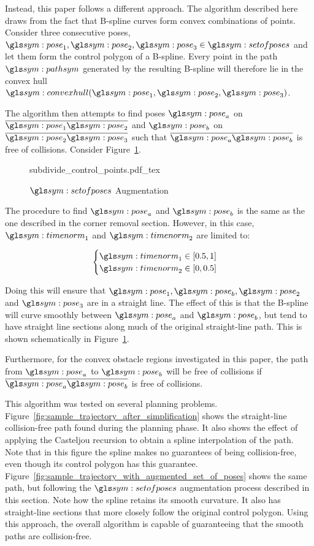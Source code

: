		Instead, this paper follows a different approach. The algorithm
		described here draws from the fact that B-spline curves form convex
		combinations of points. Consider three consecutive poses, $\pose_1,
		\pose_2, \pose_3 \in \setofposes$ and let them form the control polygon
		of a B-spline. Every point in the path $\pathsym$ generated by the
		resulting B-spline will therefore lie in the convex hull
		$\convexhull(\pose_1, \pose_2, \pose_3)$.

		The algorithm then attempts to find poses $\pose_a$ on
		$\vecline{\pose_1}{\pose_2}$ and $\pose_b$ on
		$\vecline{\pose_2}{\pose_3}$ such that $\vecline{\pose_a}{\pose_b}$ is
		free of collisions. Consider Figure~\ref{fig:set_of_poses_augmentation}.

		\begin{figure}[hbt]
			\centering
			\def\svgwidth{0.7\columnwidth}
			{subdivide_control_points.pdf_tex}
			\caption{$\setofposes$ Augmentation}%
			\label{fig:set_of_poses_augmentation}
		\end{figure}

		The procedure to find $\pose_a$ and $\pose_b$ is the same as the one
		described in the corner removal section. However, in this case,
		$\timenorm_1$ and $\timenorm_2$ are limited to:

		\begin{equation}
			\begin{cases}
				\timenorm_1 \in [0.5, 1] \\
				\timenorm_2 \in [0, 0.5]
			\end{cases}
		\end{equation}

		Doing this will ensure that $\pose_1, \pose_b, \pose_2$ and $\pose_3$
		are in a straight line. The effect of this is that the B-spline will
		curve smoothly between $\pose_a$ and $\pose_b$, but tend to have
		straight line sections along much of the original straight-line path.
		This is shown schematically in
		Figure~\ref{fig:set_of_poses_augmentation}.

		Furthermore, for the convex obstacle regions investigated in this paper,
		the path from $\pose_a$ to $\pose_b$ will be free of collisions if
		$\vecline{\pose_a}{\pose_b}$ is free of collisions.

		This algorithm was tested on several planning problems.
		Figure~\ref{fig:sample_trajectory_after_simplification} shows the
		straight-line collision-free path found during the planning phase. It
		also shows the effect of applying the Casteljou recursion to obtain a
		spline interpolation of the path. Note that in this figure the spline
		makes no guarantees of being collision-free, even though its control
		polygon has this guarantee.
		Figure~\ref{fig:sample_trajectory_with_augmented_set_of_poses} shows the
		same path, but following the $\setofposes$ augmentation process
		described in this section. Note how the spline retains its smooth
		curvature. It also has straight-line sections that more closely follow
		the original control polygon. Using this approach, the overall algorithm
		is capable of guaranteeing that the smooth paths are collision-free.

